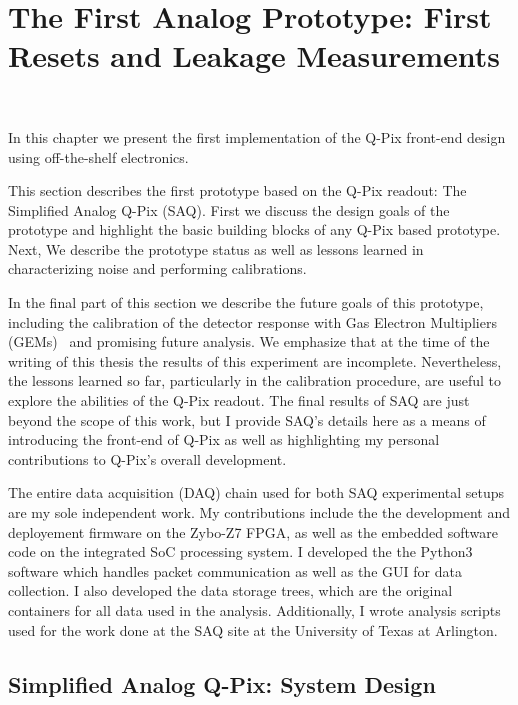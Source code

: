 \chapter{The First Analog Prototype: First Resets and Leakage Measurements}~\label{chap:saq}

In this chapter we present the first implementation of the Q-Pix front-end design using off-the-shelf electronics.

This section describes the first prototype based on the Q-Pix readout: The Simplified Analog Q-Pix (SAQ).
First we discuss the design goals of the prototype and highlight the basic building blocks of any Q-Pix based prototype.
Next, We describe the prototype status as well as lessons learned in characterizing noise and performing calibrations.

In the final part of this section we describe the future goals of this prototype, including the calibration of the detector response with Gas Electron Multipliers (GEMs)~\citep{SAULI20162} and promising future analysis.
We emphasize that at the time of the writing of this thesis the results of this experiment are incomplete.
Nevertheless, the lessons learned so far, particularly in the calibration procedure, are useful to explore the abilities of the Q-Pix readout.
The final results of SAQ are just beyond the scope of this work, but I provide SAQ's details here as a means of introducing the front-end of Q-Pix as well as highlighting my personal contributions to Q-Pix's overall development.

The entire data acquisition (DAQ) chain used for both SAQ experimental setups are my sole independent work.
My contributions include the the development and deployement firmware on the Zybo-Z7 FPGA, as well as the embedded software code on the integrated SoC processing system.
I developed the the Python3 software which handles packet communication as well as the GUI for data collection.
I also developed the data storage trees, which are the original containers for all data used in the analysis. 
Additionally, I wrote analysis scripts used for the work done at the SAQ site at the University of Texas at Arlington.

\section{Simplified Analog Q-Pix: System Design}

